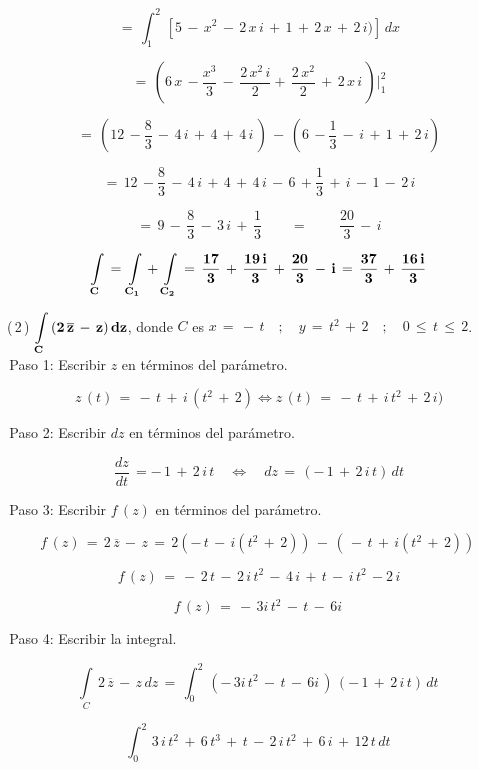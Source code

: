\documentclass[a4paper,11pt,openany]{book}
\begin{document}
$$=\,\displaystyle\int_{1}^{2}\,[5\,-\,x^{2}\,-\,2\,x\,i\,+\,1\,+\,2\,x\,+\,2\,i)]\,dx$$

$$=\,\left(6\,x\,-\dfrac{x^{3}}{3}\,-\,\dfrac{2\,x^{2}\,i}{2}+\,\dfrac{2\,x^{2}}{2}\,+\,2\,x\,i\,\right)\bigg|_{1}^{2}$$

$$=\,\left(12\,-\dfrac{8}{3}\,-\,4\,i\,+\,4\,+\,4\,i\,\right)\,-\,\left(6\,-\dfrac{1}{3}\,-\,i\,+\,1\,+\,2\,i\right)$$

$$=\,12\,-\dfrac{8}{3}\,-\,4\,i\,+\,4\,+\,4\,i\,-\,6\,+\dfrac{1}{3}\,+\,i\,-\,1\,-\,2\,i$$

$$=\,9\,-\,\dfrac{8}{3}\,-\,3\,i\,+\,\dfrac{1}{3} \qquad=\qquad\,\dfrac{20}{3}\,-\,i$$

$$\bf{\displaystyle\int\limits_{C}\,=\,\displaystyle\int\limits_{C_{1}}\,+\,\displaystyle\int\limits_{C_{2}}\,=\,\dfrac{17}{3}\,+\,\dfrac{19\,i}{3}\,+\,\dfrac{20}{3}\,-\,i\,=\,\dfrac{37}{3}\,+\,\dfrac{16\,i}{3}}$$

\textcolor{ao(english)}{(\,2\,)} $\bf{\displaystyle\int\limits_{C}\,(2\,\overline{z}\,-\,z)\,dz}$, \qquad donde \qquad $C$ es $x\,=\,-\,t \quad;\quad y\,=\,t^{2}\,+\,2 \quad;\quad 0\,\leq\,t\,\leq\,2$.\\

\textcolor{ao(english)}{\,Paso 1:} Escribir $z$ en términos del parámetro.

$$z\,(t)\,=\,-\,t\,+\,i\,(t^{2}\,+\,2) \iff z\,(t)\,=\,-\,t\,+\,i\,t^{2}\,+\,2\,i)$$

\textcolor{ao(english)}{\,Paso 2:} Escribir $dz$ en términos del parámetro.

$$\dfrac{dz}{dt}\,=-\,1\,+\,2\,i\,t \quad\iff\quad dz\,=\,(-\,1\,+\,2\,i\,t)\,dt$$

\textcolor{ao(english)}{\,Paso 3:} Escribir $f\,(z)$ en términos del parámetro.

$$f\,(z)\,=\,2\,\overline{z}\,-\,z\,=\,2(-\,t\,-\,i(t^{2}\,+\,2))\,-\,(\,-\,t\,+\,i(t^{2}\,+\,2))\, $$

$$f\,(z)\,= \,-\,2\,t\,-\,2\,i\,t^{2}\,-\,4\,i\,+\,t\,-\,i\,t^{2}\,-2\,i  $$

$$f\,(z)\,= \,-\,3i\,t^{2}\,-\,t\,-\,6i\,  $$

\textcolor{ao(english)}{\,Paso 4:} Escribir la integral.

$$\displaystyle\int\limits_{C}\,2\,\overline{z}\,-\,z\,dz\,=\,\displaystyle\int_{0}^{2}\,(-\,3i\,t^{2}\,-\,t\,-\,6i\,)\,(-\,1\,+\,2\,i\,t)\,dt\,$$

$$\displaystyle\int_{0}^{2}\,3\,i\,t^{2}\,+\,6\,t^{3}\,+\,t\,-\,2\,i\,t^{2}\,+\,6\,i\,+\,12\,t\, dt\,$$
\end{document}
